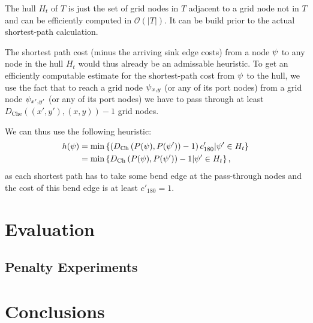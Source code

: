 \documentclass[sigconf]{acmart}
\begin{document}
The hull $H_t$ of $T$ is just the set of grid nodes in $T$ adjacent to a grid node not in $T$ and can be efficiently computed in $\mathcal{O}(|T|)$.
It can be build prior to the actual shortest-path calculation.

The shortest path cost (minus the arriving sink edge costs) from a node $\psi$ to any node in the hull $H_t$ would thus already be an admissable heuristic.
To get an efficiently computable estimate for the shortest-path cost from $\psi$ to the hull, we use the fact that to reach a grid node $\psi_{x, y}$ (or any of its port nodes) from a grid node $\psi_{x', y'}$ (or any of its port nodes) we have to pass through at least $D_{\text{Che}}((x', y'), (x, y)) - 1$ grid nodes.

We can thus use the following heuristic:
%
\begin{align}
	h(\psi) &= \min\left\{ \left(D_{\text{Ch}}\left(P(\psi), P(\psi') \right) - 1\right) c'_{180}| \psi' \in H_t \right\}\\
	&= \min\left\{ D_{\text{Ch}}\left(P(\psi), P(\psi') \right) - 1 | \psi' \in H_t \right\},
\end{align}
%
as each shortest path has to take some bend edge at the pass-through nodes and the cost of this bend edge is at least $c'_{180} = 1$.

\section{Evaluation}

\subsection{Penalty Experiments}

\section{Conclusions}
\end{document}
